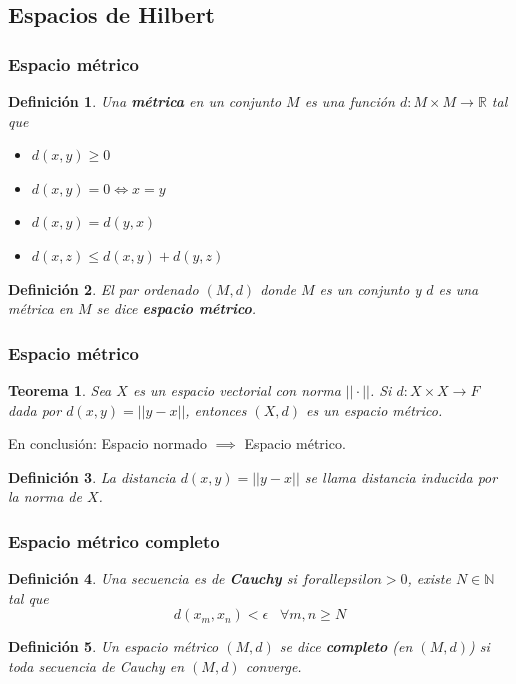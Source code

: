 \documentclass{beamer}
\newtheorem{teo}{Teorema}
\newtheorem{defi}{Definición}
\begin{document}
\subsection{Espacios de Hilbert}
\begin{frame}
    \frametitle{Espacio métrico}
    \begin{defi}
        Una \textbf{métrica} en un conjunto $M$ es una función $d : M \times M \to \mathbb{R}$ tal que
        \begin{itemize}
            \item $d(x,y) \geq 0$
            \item $d(x,y) = 0 \iff x = y$
            \item $d(x,y) = d(y,x)$
            \item $d(x,z) \leq d(x,y) + d(y,z)$
        \end{itemize}
    \end{defi}
	\pause
    \begin{defi}
        El par ordenado $(M,d)$ donde $M$ es un conjunto y $d$ es una métrica en $M$ se dice \textbf{espacio métrico}.
    \end{defi}
\end{frame}
\begin{frame}
\frametitle{Espacio métrico}
    \begin{teo}
        Sea $X$ es un espacio vectorial con norma $|| \cdot ||$. Si $d: X \times X \to F$ dada por
        $d(x,y) = ||y-x||$, entonces $(X,d)$ es un espacio métrico.
    \end{teo}
	\pause
    En conclusión:
    Espacio normado $\implies$ Espacio métrico.
	\pause
    \begin{defi}
        La distancia $d(x,y) = ||y-x||$ se llama distancia inducida por la norma de $X$.
    \end{defi}
\end{frame}
\begin{frame}
\frametitle{Espacio métrico completo}
    \begin{defi}
        Una secuencia es de \textbf{Cauchy} si $forall epsilon >0$, existe $N \in \mathbb{N}$ tal que
        $$
        d(x_m,x_n) < \epsilon\;\;\; \forall m,n \geq N
        $$
    \end{defi}
	\pause
\begin{defi}
    Un espacio métrico $(M,d)$ se dice \textbf{completo} (en $(M,d)$) si
    toda secuencia de Cauchy en $(M,d)$ converge.
\end{defi}
\end{frame}
\end{document}
